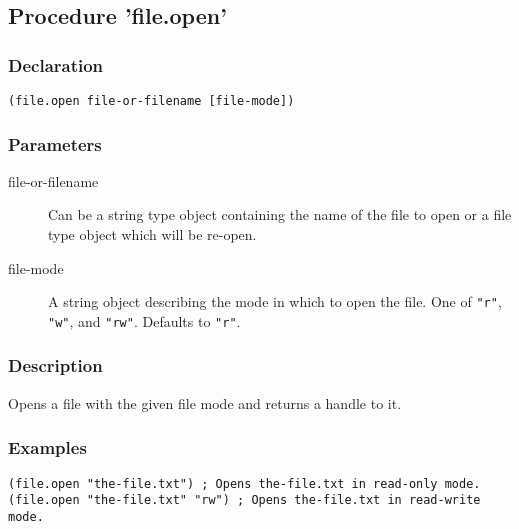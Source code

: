 \subsection{Procedure 'file.open'}
\label{builtins/file.open}

\subsubsection*{Declaration}
\begin{lstlisting}
(file.open file-or-filename [file-mode])
\end{lstlisting}

\subsubsection*{Parameters}
\begin{description}
	\item[file-or-filename] Can be a string type object containing the name of the file to open or a file type object which will be re-open.
	\item[file-mode] A string object describing the mode in which to open the file. One of \lstinline|"r"|, \lstinline|"w"|, and \lstinline|"rw"|. Defaults to \lstinline|"r"|.
\end{description}

\subsubsection*{Description}
Opens a file with the given file mode and returns a handle to it.

\subsubsection*{Examples}
\begin{lstlisting}
(file.open "the-file.txt") ; Opens the-file.txt in read-only mode.
(file.open "the-file.txt" "rw") ; Opens the-file.txt in read-write mode.
\end{lstlisting}
